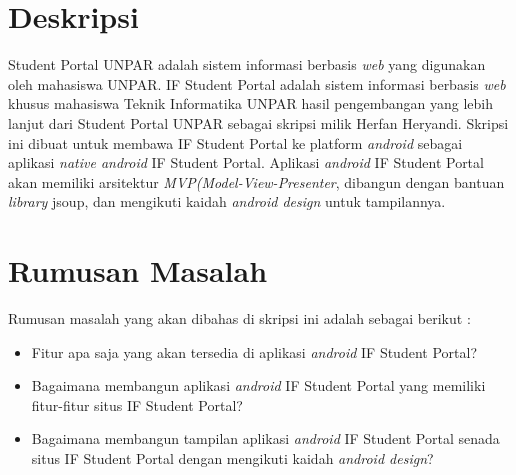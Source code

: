 \documentclass[a4paper,twoside]{article}
\begin{document}
\title{\@judultopik}
\author{\nama \textendash \@npm} 

\newcommand{\nama}{David Christopher}
\newcommand{\@npm}{2017730015}
\newcommand{\@judultopik}{Pembangunan Aplikasi \textit{Android} IF Student Portal } %
\newcommand{\jumpemb}{1} %
\newcommand{\tanggal}{08/10/2020}


\maketitle


\section{Deskripsi}
Student Portal UNPAR adalah sistem informasi berbasis \textit{web} yang digunakan oleh mahasiswa UNPAR. IF Student Portal adalah sistem informasi berbasis \textit{web} khusus mahasiswa Teknik Informatika UNPAR hasil pengembangan yang lebih lanjut dari Student Portal UNPAR sebagai skripsi milik Herfan Heryandi. Skripsi ini dibuat untuk membawa IF Student Portal ke platform \textit{android} sebagai aplikasi \textit{native android} IF Student Portal. Aplikasi \textit{android} IF Student Portal akan memiliki arsitektur \textit{MVP(Model-View-Presenter}, dibangun dengan bantuan \textit{library} jsoup, dan mengikuti kaidah \textit{android design} untuk tampilannya.  

\section{Rumusan Masalah}
Rumusan masalah yang akan dibahas di skripsi ini adalah sebagai berikut :
\begin{itemize}
    \item Fitur apa saja yang akan tersedia di aplikasi \textit{android} IF Student Portal?
    \item Bagaimana membangun aplikasi \textit{android} IF Student Portal yang memiliki fitur-fitur situs IF  Student Portal?
    \item Bagaimana membangun tampilan aplikasi \textit{android} IF Student Portal senada situs IF Student Portal dengan mengikuti kaidah \textit{android design}?
    
\end{itemize}
\end{document}
